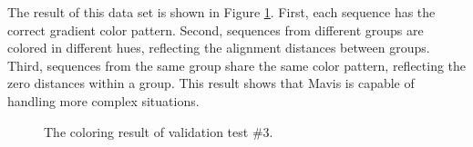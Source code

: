 The result of this data set is shown in Figure \ref{fig:test_3}. First, each sequence has the correct gradient color pattern. Second, sequences from different groups are colored in different hues, reflecting the alignment distances between groups. Third, sequences from the same group share the same color pattern, reflecting the zero distances within a group. This result shows that Mavis is capable of handling more complex situations.

\begin{figure}[htb]
\caption[Coloring Result of Validation Test \#3]{The coloring result of validation test \#3.}\label{fig:test_3}
\end{figure}

% 
% 
% 
